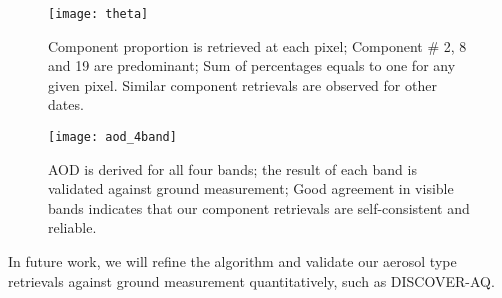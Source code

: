 \begin{figure}[h!]
    \centering
    \texttt{[image: theta]}
    \caption{Component proportion is retrieved at each pixel; Component \# 2, 8 and 19 are predominant; Sum of percentages equals to one for any given pixel. Similar component retrievals are observed for other dates.}
    \label{fig:component}
\end{figure}

\begin{figure}[h!]
    \centering
    \texttt{[image: aod\_4band]}
    \caption{AOD is derived for all four bands; the result of each band is validated against ground measurement; Good agreement in visible bands indicates that our component retrievals are self-consistent and reliable.}
    \label{fig:aod_4band}
\end{figure}

In future work, we will refine the algorithm and validate our aerosol type retrievals against ground measurement quantitatively, such as DISCOVER-AQ.
